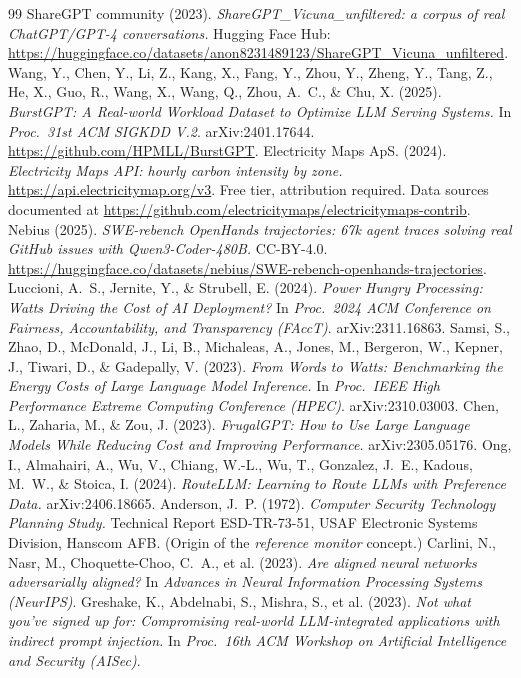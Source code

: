 \documentclass[11pt]{article}
\theoremstyle{plain}
\theoremstyle{definition}
\theoremstyle{remark}
\begin{document}
\begin{thebibliography}{99}
 ShareGPT community (2023). \emph{ShareGPT\_Vicuna\_unfiltered: a corpus of real ChatGPT/GPT-4 conversations.} Hugging Face Hub: \url{https://huggingface.co/datasets/anon8231489123/ShareGPT_Vicuna_unfiltered}.
 Wang, Y., Chen, Y., Li, Z., Kang, X., Fang, Y., Zhou, Y., Zheng, Y., Tang, Z., He, X., Guo, R., Wang, X., Wang, Q., Zhou, A.~C., \& Chu, X. (2025). \emph{BurstGPT: A Real-world Workload Dataset to Optimize LLM Serving Systems.} In \emph{Proc.\ 31st ACM SIGKDD V.2}. arXiv:2401.17644. \url{https://github.com/HPMLL/BurstGPT}.
 Electricity Maps ApS. (2024). \emph{Electricity Maps API: hourly carbon intensity by zone.} \url{https://api.electricitymap.org/v3}. Free tier, attribution required. Data sources documented at \url{https://github.com/electricitymaps/electricitymaps-contrib}.
 Nebius (2025). \emph{SWE-rebench OpenHands trajectories: 67k agent traces solving real GitHub issues with Qwen3-Coder-480B.} CC-BY-4.0. \url{https://huggingface.co/datasets/nebius/SWE-rebench-openhands-trajectories}.
 Luccioni, A.~S., Jernite, Y., \& Strubell, E. (2024). \emph{Power Hungry Processing: Watts Driving the Cost of AI Deployment?} In \emph{Proc.\ 2024 ACM Conference on Fairness, Accountability, and Transparency (FAccT)}. arXiv:2311.16863.
 Samsi, S., Zhao, D., McDonald, J., Li, B., Michaleas, A., Jones, M., Bergeron, W., Kepner, J., Tiwari, D., \& Gadepally, V. (2023). \emph{From Words to Watts: Benchmarking the Energy Costs of Large Language Model Inference.} In \emph{Proc.\ IEEE High Performance Extreme Computing Conference (HPEC)}. arXiv:2310.03003.
 Chen, L., Zaharia, M., \& Zou, J. (2023). \emph{FrugalGPT: How to Use Large Language Models While Reducing Cost and Improving Performance.} arXiv:2305.05176.
 Ong, I., Almahairi, A., Wu, V., Chiang, W.-L., Wu, T., Gonzalez, J.~E., Kadous, M.~W., \& Stoica, I. (2024). \emph{RouteLLM: Learning to Route LLMs with Preference Data.} arXiv:2406.18665.
 Anderson, J.~P. (1972). \emph{Computer Security Technology Planning Study.} Technical Report ESD-TR-73-51, USAF Electronic Systems Division, Hanscom AFB. (Origin of the \emph{reference monitor} concept.)
 Carlini, N., Nasr, M., Choquette-Choo, C.~A., et al. (2023). \emph{Are aligned neural networks adversarially aligned?} In \emph{Advances in Neural Information Processing Systems (NeurIPS)}.
 Greshake, K., Abdelnabi, S., Mishra, S., et al. (2023). \emph{Not what you've signed up for: Compromising real-world LLM-integrated applications with indirect prompt injection.} In \emph{Proc.\ 16th ACM Workshop on Artificial Intelligence and Security (AISec)}.

\end{thebibliography}
\end{document}
